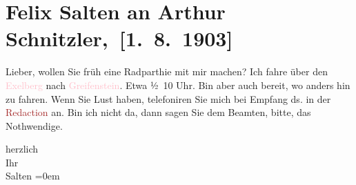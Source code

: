 

\renewcommand{\erwaehnteInstitutionen}{Institutionen: Die Zeit}
\renewcommand{\erwaehnteOrte}{Orte: Exelberg, Greifenstein, Wien}
\renewcommand{\erwaehnteWerke}{}
\section[ Felix Salten an Arthur Schnitzler, {[}1. 8. 1903{]}]{Felix Salten an Arthur Schnitzler, {[}1. 8. 1903{]}}
\nopagebreak{}
\rehead{ }\normalsize\beginnumbering{}
\toendnotes[C]{\smallbreak\pagebreak[2]}
\toendnotes[C]{\smallbreak}
\pstart
           \noindent{}{\pb}Lieber, wollen Sie \label{K_L03341-1v}\label{K_L03341-1h}{ }früh eine Radparthie mit mir
               machen? Ich fahre über den \textcolor{pink}{Exelberg}{}\ledrightnote{\textcolor{pink}{Exelberg}} nach \textcolor{pink}{Greifenstein}{}\ledrightnote{\textcolor{pink}{Greifenstein}}. Etwa ½ 10 Uhr. Bin
               aber auch bereit, wo anders hin zu fahren. Wenn Sie Lust haben, telefoniren Sie mich
               bei Empfang ds. in der \textcolor{brown}{Redaction}{}\ledrightnote{{$\rightarrow$}\textcolor{brown}{Die Zeit}} an. Bin ich nicht da, dann sagen Sie dem Beamten, bitte, das
               Nothwendige.\pend
           
\pstart
           herzlich {\\[\baselineskip]}Ihr {\\[\baselineskip]}\spacefill\mbox{Salten}\pend
           \leftskip=0em{}\endnumbering{}  
      